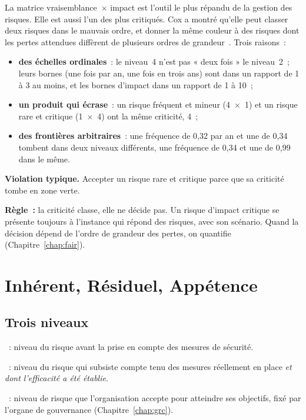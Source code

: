 La matrice vraisemblance~$\times$ impact est l'outil le plus répandu de la
gestion des risques. Elle est aussi l'un des plus critiqués. Cox a montré
qu'elle peut classer deux risques dans le mauvais ordre, et donner la même
couleur à des risques dont les pertes attendues diffèrent de plusieurs
ordres de grandeur~\cite{cox2008matrices}. Trois raisons~:
\begin{itemize}
    \item \textbf{des échelles ordinales}~: le niveau~4 n'est pas « deux
          fois » le niveau~2~; leurs bornes (une fois par an, une fois en
          trois ans) sont dans un rapport de 1 à 3 au moins, et les bornes
          d'impact dans un rapport de 1 à 10~;
    \item \textbf{un produit qui écrase}~: un risque fréquent et mineur
          (4~$\times$~1) et un risque rare et critique (1~$\times$~4) ont la
          même criticité, 4~;
    \item \textbf{des frontières arbitraires}~: une fréquence de 0,32 par
          an et une de 0,34 tombent dans deux niveaux différents, une
          fréquence de 0,34 et une de 0,99 dans le même.
\end{itemize}

\begin{boxalert}
\textbf{Violation typique.} Accepter un risque rare et critique parce que
sa criticité tombe en zone verte.

\smallskip
\textbf{Règle~:} la criticité classe, elle ne décide pas. Un risque
d'impact critique se présente toujours à l'instance qui répond des
risques, avec son scénario. Quand la décision dépend de l'ordre de
grandeur des pertes, on quantifie (Chapitre~\ref{chap:fair}).
\end{boxalert}

\section{Inhérent, Résiduel, Appétence}
\label{sec:c02-residuel}

\subsection{Trois niveaux}

\begin{boxdef}
~: niveau du risque
avant la prise en compte des mesures de sécurité.

\medskip
{}~: niveau du risque qui
subsiste compte tenu des mesures réellement en place \emph{et dont
l'efficacité a été établie}.

\medskip
{}~: niveau de
risque que l'organisation accepte pour atteindre ses objectifs, fixé par
l'organe de gouvernance (Chapitre~\ref{chap:grc}).
\end{boxdef}

